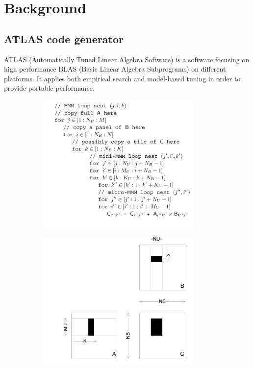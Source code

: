 \section{Background}
\label{sec:background}

  \subsection{ATLAS code generator}
  \label{sec:atlas_intro}
  ATLAS (Automatically Tuned Linear Algebra Software) is a software focusing on high performance
  BLAS (Basic Linear Algebra Subprograms) on different platforms. It applies both empirical search and model-based
  tuning in order to provide portable performance. \par


  \begin{figure}
  \centering
  \begin{subfigure}{1.0\linewidth}
    \centering
    \includegraphics[width=0.9\textwidth]{images/ATLAS_code.png}
    \caption{}
    \label{fig:ATLAS_code}
  \end{subfigure}
  \begin{subfigure}[t]{1.0\linewidth}
    \centering
    \includegraphics[width=0.9\textwidth]{images/ATLAS_pic.png}

\end{subfigure}
\end{figure}
